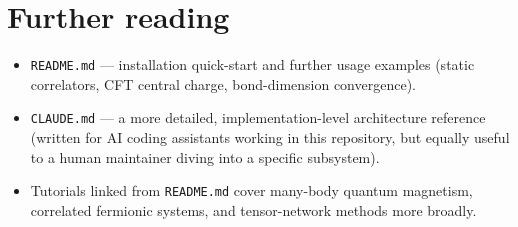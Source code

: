 \documentclass[11pt]{article}
\begin{document}
\section{Further reading}

\begin{itemize}
  \item \texttt{README.md} --- installation quick-start and further usage
    examples (static correlators, CFT central charge, bond-dimension
    convergence).
  \item \texttt{CLAUDE.md} --- a more detailed, implementation-level
    architecture reference (written for AI coding assistants working in
    this repository, but equally useful to a human maintainer diving
    into a specific subsystem).
  \item Tutorials linked from \texttt{README.md} cover many-body quantum
    magnetism, correlated fermionic systems, and tensor-network methods
    more broadly.
\end{itemize}
\end{document}

